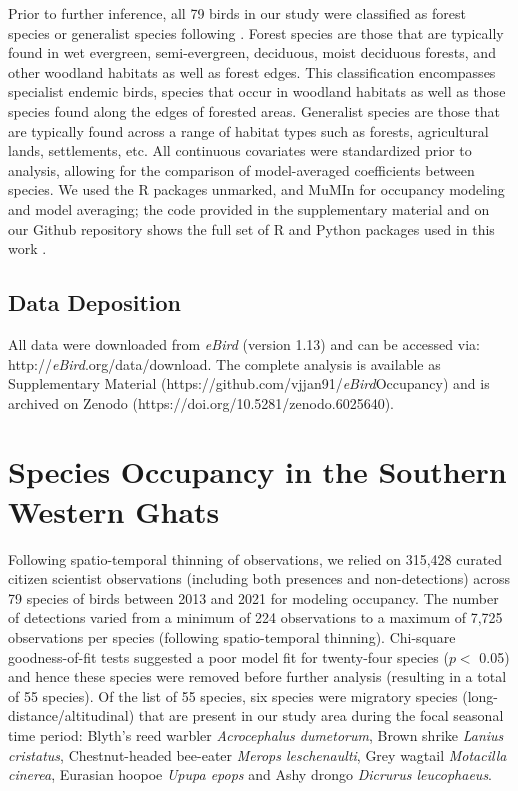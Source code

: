 Prior to further inference, all 79 birds in our study were classified as forest species or generalist species following \citep{ali1983}.
Forest species are those that are typically found in wet evergreen, semi-evergreen, deciduous, moist deciduous forests, and other woodland habitats as well as forest edges.
This classification encompasses specialist endemic birds, species that occur in woodland habitats as well as those species found along the edges of forested areas.
Generalist species are those that are typically found across a range of habitat types such as forests, agricultural lands, settlements, etc.
All continuous covariates were standardized prior to analysis, allowing for the comparison of model-averaged coefficients between species.
We used the R packages unmarked, and MuMIn for occupancy modeling and model averaging; the code provided in the supplementary material and on our Github repository shows the full set of R and Python packages used in this work \citep{barton2009,fiske2011,r2020}.

\subsection*{Data Deposition}

All data were downloaded from \textit{eBird} (version 1.13) and can be accessed via: http://\textit{eBird}.org/data/download.
The complete analysis is available as Supplementary Material (https://github.com/vjjan91/\textit{eBird}Occupancy) and is archived on Zenodo (https://doi.org/10.5281/zenodo.6025640).

\section*{Species Occupancy in the Southern Western Ghats}

Following spatio-temporal thinning of observations, we relied on 315,428 curated citizen scientist observations (including both presences and non-detections) across 79 species of birds between 2013 and 2021 for modeling occupancy.
The number of detections varied from a minimum of 224 observations to a maximum of 7,725 observations per species (following spatio-temporal thinning).
Chi-square goodness-of-fit tests suggested a poor model fit for twenty-four species ($p <$ 0.05) and hence these species were removed before further analysis (resulting in a total of 55 species).
Of the list of 55 species, six species were migratory species (long-distance/altitudinal) that are present in our study area during the focal seasonal time period: Blyth's reed warbler \textit{Acrocephalus dumetorum}, Brown shrike \textit{Lanius cristatus}, Chestnut-headed bee-eater \textit{Merops leschenaulti}, Grey wagtail \textit{Motacilla cinerea}, Eurasian hoopoe \textit{Upupa epops} and Ashy drongo \textit{Dicrurus leucophaeus}.

